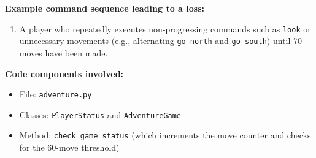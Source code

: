 \documentclass[11pt]{article}
\begin{document}
\medskip
\textbf{Example command sequence leading to a loss:}
\begin{enumerate}
    \item A player who repeatedly executes non-progressing commands such as \texttt{look} or unnecessary movements (e.g., alternating \texttt{go north} and \texttt{go south}) until 70 moves have been made.
\end{enumerate}

\medskip
\textbf{Code components involved:}
\begin{itemize}
    \item File: \texttt{adventure.py}
    \item Classes: \texttt{PlayerStatus} and \texttt{AdventureGame}
    \item Method: \texttt{check\_game\_status} (which increments the move counter and checks for the 60-move threshold)
\end{itemize}
\end{document}
